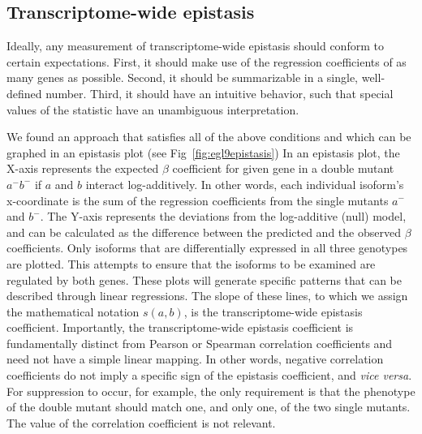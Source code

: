 \documentclass[9pt,twocolumn,twoside]{pnas-new}
\begin{document}
\subsection*{Transcriptome-wide epistasis}
Ideally, any measurement of transcriptome-wide epistasis should conform to
certain expectations. First, it should make use of the regression coefficients
of as many genes as possible. Second, it should be summarizable in a single,
well-defined number. Third, it should have an intuitive behavior, such that
special values of the statistic have an unambiguous interpretation.

We found an approach that satisfies all of the above conditions and which can be
graphed in an epistasis plot (see Fig~\ref{fig:egl9epistasis}) In an epistasis
plot, the X-axis represents the expected $\beta$ coefficient for given gene in a
double mutant $a^-b^-$ if $a$ and $b$ interact log-additively. In other words,
each individual isoform's x-coordinate is the sum of the regression coefficients
from the single mutants $a^-$ and $b^-$. The Y-axis represents the deviations
from the log-additive (null) model, and can be calculated as the difference
between the predicted and the observed $\beta$ coefficients. Only isoforms that
are differentially expressed in all three genotypes are plotted. This attempts
to ensure that the isoforms to be examined are regulated by both genes. These
plots will generate specific patterns that can be described through linear
regressions. The slope of these lines, to which we assign the mathematical
notation $s({a,b})$, is the transcriptome-wide epistasis coefficient.
Importantly, the transcriptome-wide epistasis coefficient is fundamentally
distinct from  Pearson or Spearman correlation coefficients and need not have a
simple linear mapping. In other words, negative correlation coefficients do not
imply a specific sign of the epistasis coefficient, and \emph{vice versa}. For
suppression to occur, for example, the only requirement is that the phenotype of
the double mutant should match one, and only one, of the two single mutants. The
value of the correlation coefficient is not relevant.
\end{document}
